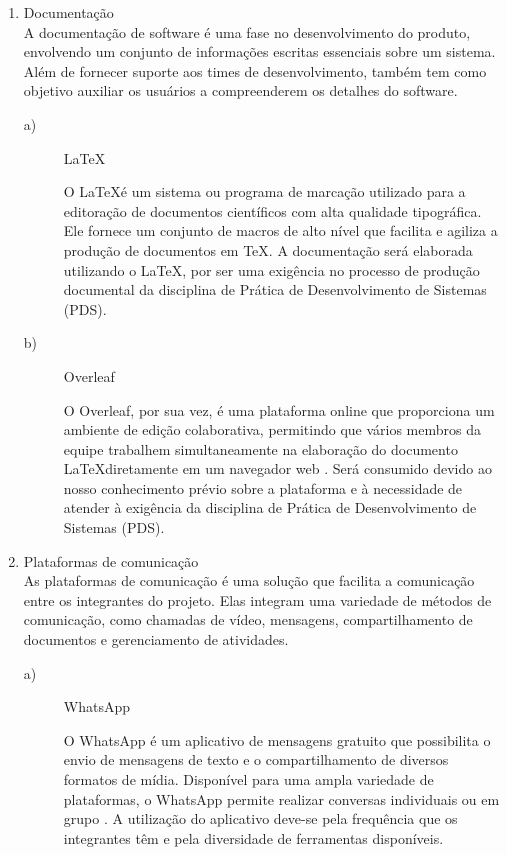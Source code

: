 \documentclass[
    article,			%
    12pt,				%
    oneside,            %
    a4paper,			%
    english,			%
    brazil,				%
    ]{abntex2}
\begin{document}
\begin{enumerate}
    \item Documentação \\
        A documentação de software é uma fase no desenvolvimento do produto, envolvendo um conjunto de informações escritas essenciais sobre um sistema. Além de fornecer suporte aos times de desenvolvimento, também tem como objetivo auxiliar os usuários a compreenderem os detalhes do software. \\
        
\begin{description}
    \item[a)] \LaTeX \par O \LaTeX \space é um sistema ou programa de marcação utilizado para a editoração de documentos científicos com alta qualidade tipográfica. Ele fornece um conjunto de macros de alto nível que facilita e agiliza a produção de documentos em \TeX \space \cite{Overleaf_Latex}. A documentação será elaborada utilizando o \LaTeX, por ser uma exigência no processo de produção documental da disciplina de Prática de Desenvolvimento de Sistemas (PDS).\\
    
    \item[b)] Overleaf \par O Overleaf, por sua vez, é uma plataforma online que proporciona um ambiente de edição colaborativa, permitindo que vários membros da equipe trabalhem simultaneamente na elaboração do documento \LaTeX \space diretamente em um navegador web \cite{Overleaf_Latex}. Será consumido devido ao nosso conhecimento prévio sobre a plataforma e à necessidade de atender à exigência da disciplina de Prática de Desenvolvimento de Sistemas (PDS). \\
\end{description}

    \item Plataformas de comunicação \\
        As plataformas de comunicação é uma solução que facilita a comunicação entre os integrantes do projeto. Elas integram uma variedade de métodos de comunicação, como chamadas de vídeo, mensagens, compartilhamento de documentos e gerenciamento de atividades. \\
        
\begin{description}
    \item[a)] WhatsApp \par O WhatsApp é um aplicativo de mensagens gratuito que possibilita o envio de mensagens de texto e o compartilhamento de diversos formatos de mídia. Disponível para uma ampla variedade de plataformas, o WhatsApp permite realizar conversas individuais ou em grupo \cite{Whats}. A utilização do aplicativo deve-se pela frequência que os integrantes têm e pela diversidade de ferramentas disponíveis. \\
    

\end{description}
\end{enumerate}
\end{document}
